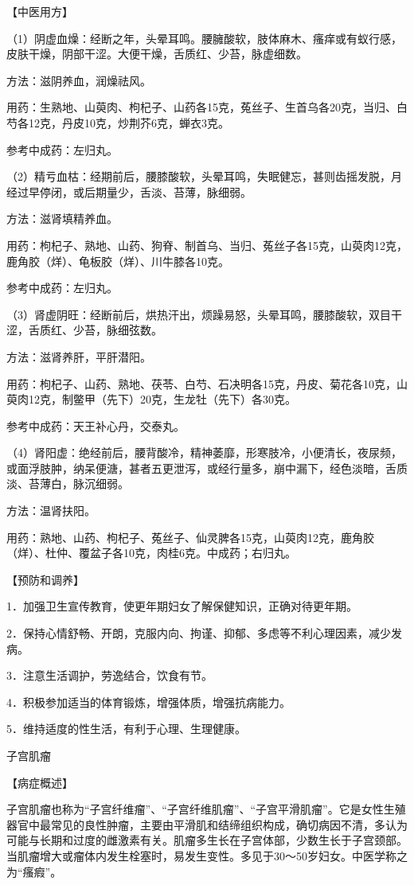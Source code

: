 \documentclass[12pt,UTF8]{ctexbook}
\begin{document}
【中医用方】

（1）阴虚血燥：经断之年，头晕耳鸣。腰臃酸软，肢体麻木、瘙痒或有蚁行感，皮肤干燥，阴部干涩。大便干燥，舌质红、少苔，脉虚细数。

方法：滋阴养血，润燥祛风。

用药：生熟地、山萸肉、枸杞子、山药各15克，菟丝子、生首乌各20克，当归、白芍各12克，丹皮10克，炒荆芥6克，蝉衣3克。

参考中成药：左归丸。

（2）精亏血枯：经期前后，腰膝酸软，头晕耳鸣，失眠健忘，甚则齿摇发脱，月经过早停闭，或后期量少，舌淡、苔薄，脉细弱。

方法：滋肾填精养血。

用药：枸杞子、熟地、山药、狗脊、制首乌、当归、菟丝子各15克，山萸肉12克，鹿角胶（烊）、龟板胶（烊）、川牛膝各10克。

参考中成药：左归丸。

（3）肾虚阴旺：经断前后，烘热汗出，烦躁易怒，头晕耳鸣，腰膝酸软，双目干涩，舌质红、少苔，脉细弦数。

方法：滋肾养肝，平肝潜阳。

用药：枸杞子、山药、熟地、茯苓、白芍、石决明各15克，丹皮、菊花各10克，山萸肉12克，制鳖甲（先下）20克，生龙牡（先下）各30克。

参考中成药：天王补心丹，交泰丸。

（4）肾阳虚：绝经前后，腰背酸冷，精神萎靡，形寒肢冷，小便清长，夜尿频，或面浮肢肿，纳呆便溏，甚者五更泄泻，或经行量多，崩中漏下，经色淡暗，舌质淡、苔薄白，脉沉细弱。

方法：温肾扶阳。

用药：熟地、山药、枸杞子、菟丝子、仙灵脾各15克，山萸肉12克，鹿角胶（烊）、杜仲、覆盆子各10克，肉桂6克。中成药；右归丸。

【预防和调养】

1．加强卫生宣传教育，使更年期妇女了解保健知识，正确对待更年期。

2．保持心情舒畅、开朗，克服内向、拘谨、抑郁、多虑等不利心理因素，减少发病。

3．注意生活调护，劳逸结合，饮食有节。

4．积极参加适当的体育锻炼，增强体质，增强抗病能力。

5．维持适度的性生活，有利于心理、生理健康。





子宫肌瘤


【病症概述】

子宫肌瘤也称为“子宫纤维瘤”、“子宫纤维肌瘤”、“子宫平滑肌瘤”。它是女性生殖器官中最常见的良性肿瘤，主要由平滑肌和结缔组织构成，确切病因不清，多认为可能与长期和过度的雌激素有关。肌瘤多生长在子宫体部，少数生长于子宫颈部。当肌瘤增大或瘤体内发生栓塞时，易发生变性。多见于30～50岁妇女。中医学称之为“瘙瘕”。
\end{document}
